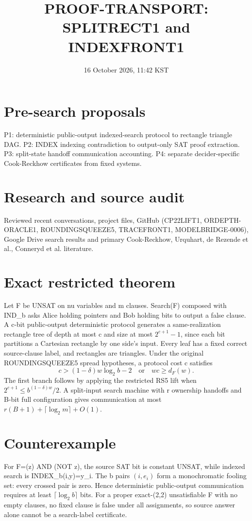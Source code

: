 \documentclass{article}
\title{PROOF-TRANSPORT: SPLITRECT1 and INDEXFRONT1}
\date{16 October 2026, 11:42 KST}
\begin{document}
\maketitle
\section{Pre-search proposals}
P1: deterministic public-output indexed-search protocol to rectangle triangle DAG.
P2: INDEX indexing contradiction to output-only SAT proof extraction.
P3: split-state handoff communication accounting.
P4: separate decider-specific Cook-Reckhow certificates from fixed systems.
\section{Research and source audit}
Reviewed recent conversations, project files, GitHub (CP22LIFT1, ORDEPTH-ORACLE1, ROUNDINGSQUEEZE5, TRACEFRONT1, MODELBRIDGE-0006), Google Drive search results and primary Cook-Reckhow, Urquhart, de Rezende et al., Conneryd et al. literature.
\section{Exact restricted theorem}
Let F be UNSAT on nu variables and m clauses. Search(F) composed with IND_b asks Alice holding pointers and Bob holding bits to output a false clause. A c-bit public-output deterministic protocol generates a same-realization rectangle tree of depth at most c and size at most $2^{c+1}-1$, since each bit partitions a Cartesian rectangle by one side's input. Every leaf has a fixed correct source-clause label, and rectangles are triangles.
Under the original ROUNDINGSQUEEZE5 spread hypotheses, a protocol cost c satisfies
\[c>(1-\delta)w\log_2 b-2\quad\mathrm{or}\quad wc\ge d_F(w).\]
The first branch follows by applying the restricted RS5 lift when $2^{c+1}\le b^{(1-\delta)w}/2$. A split-input search machine with r ownership handoffs and B-bit full configuration gives communication at most $r(B+1)+\lceil\log_2m\rceil+O(1)$.
\section{Counterexample}
For F=(z) AND (NOT z), the source SAT bit is constant UNSAT, while indexed search is INDEX_b(i,y)=y_i. The b pairs $(i,e_i)$ form a monochromatic fooling set: every crossed pair is zero. Hence deterministic public-output communication requires at least $\lceil\log_2 b\rceil$ bits. For a proper exact-(2,2) unsatisfiable F with no empty clauses, no fixed clause is false under all assignments, so source answer alone cannot be a search-label certificate.
\end{document}
